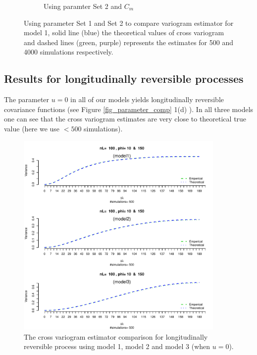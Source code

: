 \begin{figure}[H]
\begin{subfigure}{.5\textwidth}
		\caption{Using paramter Set 2 and $C_m$}
		\label{fig:sfig2}
	\end{subfigure}
	\caption[Using parameter Set 1 and Set 2 to compare variogram estimator for model 1]{Using parameter Set 1 and Set 2 to compare variogram estimator for model 1, solid line (blue) the theoretical values of cross variogram and dashed lines (green, purple) represents the estimates for 500 and 4000 simulations respectively. }
	\label{compare_varigram_sim_1}
\end{figure}


\subsection{\bf Results for longitudinally reversible processes}

The parameter $u = 0$ in all of our models yields longitudinally reversible covariance functions (see Figure \ref{fig_parameter_comp} 1(d) ). In all three models one can see that the cross variogram estimates are very close to theoretical true value (here we use $< 500$ simulations).

\begin{figure}[H]
	\centering
	\includegraphics [width=0.9\textwidth ]{graphs/results_variogram_comparison}
	\caption[The cross variogram estimator comparison for longitudinally reversible]{The cross variogram estimator comparison for longitudinally reversible process using  model 1, model 2 and model 3 (when $u=0$).}
\end{figure}

